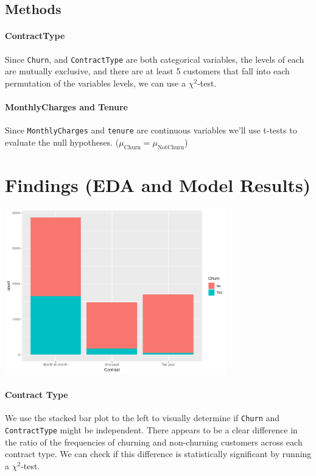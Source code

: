 \documentclass[man, floatsintext]{apa6}
\begin{document}
\subsection{Methods}

\paragraph{ContractType}
Since \texttt{Churn}, and \texttt{ContractType} are both categorical variables, the levels of each are mutually exclusive, and there are at least 5 customers that fall into each permutation of the variables levels, we can use a $\chi^2$-test.

\paragraph{MonthlyCharges and Tenure}
 Since \texttt{MonthlyCharges} and \texttt{tenure} are continuous variables we'll use t-tests to evaluate the null hypotheses. ($\mu_{\text{Churn}} = \mu_{\text{NotChurn}}$)

\section{Findings (EDA and Model Results)}

\hspace{0.5mm}

\noindent\begin{minipage}{0.54\textwidth}
\includegraphics[width = \linewidth, height = 72mm]{CountvsContractTypebyChurn}
\end{minipage}
\hfill
\begin{minipage}{0.42\textwidth}
  \paragraph{Contract Type}
  We use the stacked bar plot to the left to visually determine if \texttt{Churn} and \texttt{ContractType} might be independent. There appears to be a clear difference in the ratio of the frequencies of churning and non-churning customers across each contract type. We can check if this difference is statistically significant by running a $\chi^2$-test.

\end{minipage}
\end{document}
